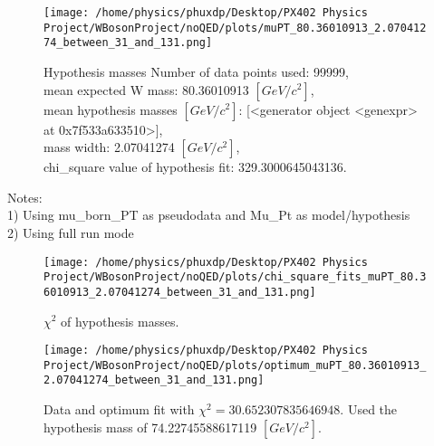 \documentclass[12pt]{article}
\begin{document}
	\begin{figure}[tb]
		\centering
		\texttt{[image: /home/physics/phuxdp/Desktop/PX402 Physics Project/WBosonProject/noQED/plots/muPT\_80.36010913\_2.07041274\_between\_31\_and\_131.png]}
		\caption{\small Hypothesis masses Number of data points used: 99999,\\
mean expected W mass: 80.36010913 $[GeV/c^{2}]$,\\
mean hypothesis masses $[GeV/c^{2}]$: [<generator object <genexpr> at 0x7f533a633510>],\\
mass width: 2.07041274 $[GeV/c^{2}]$,\\
chi_square value of hypothesis fit: 329.3000645043136. }
		\label{fig: fig_0}
	\end{figure}
    Notes: \\
    1) Using mu\_born\_PT as pseudodata and  Mu\_Pt as model/hypothesis\\
    2) Using full run mode\\
       \begin{figure}[tb]
		\centering
		\texttt{[image: /home/physics/phuxdp/Desktop/PX402 Physics Project/WBosonProject/noQED/plots/chi\_square\_fits\_muPT\_80.36010913\_2.07041274\_between\_31\_and\_131.png]}
		\caption{\small $\chi^2$ of hypothesis masses. }
		\label{fig: fig_chi_square}
	\end{figure}

    \begin{figure}[tb]
		\centering
		\texttt{[image: /home/physics/phuxdp/Desktop/PX402 Physics Project/WBosonProject/noQED/plots/optimum\_muPT\_80.36010913\_2.07041274\_between\_31\_and\_131.png]}
		\caption{\small Data and optimum fit with $\chi^2 = 30.652307835646948$. Used the hypothesis mass of 74.22745588617119 $[GeV/c^{2}]$. }
		\label{fig: fig_optim_parms}
	\end{figure}
    
\end{document}
